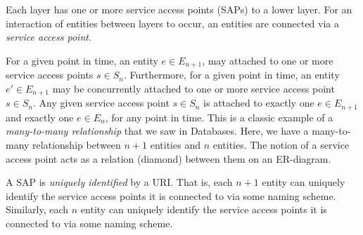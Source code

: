 Each layer has one or more service access points (SAPs) to 
a lower layer. 
For an interaction of entities between layers to occur, an entities are connected via a 
\textit{service access point}. 

For a given point in time, an entity $e \in E_{n+1}$, may attached to one or more 
service access points $s \in S_{n}$. Furthermore, for a given point in time, 
an entity $e' \in E_{n+1}$ may be concurrently attached to one or more 
service access point $s \in S_{n}$. Any given service access point $s \in S_{n}$
is attached to exactly one $e \in E_{n+1}$ and exactly one $e \in E_{n}$, 
for any point in time. This is a classic example of a \textit{many-to-many relationship} that 
we saw in Databases. Here, we have 
a many-to-many relationship between $n+1$ entities and $n$ entities. 
The notion of a service access point acts as a relation (diamond) between them on 
an ER-diagram. 


\begin{figure}[h]
\end{figure} 

A SAP is \textit{uniquely identified} by a URI. That is, 
each $n+1$ entity can uniquely identify the service access points 
it is connected to via some naming scheme. 
Similarly, each $n$ entity can uniquely identify the service access points 
it is connected to via some naming scheme. 




